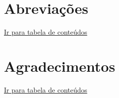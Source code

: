 \documentclass[output=paper,colorlinks,citecolor=brown]{langscibook}
\begin{document}
\chapter*{Abreviações}

\hyperlink{toc}{Ir para tabela de conteúdos\\}



\chapter*{Agradecimentos}

\hyperlink{toc}{Ir para tabela de conteúdos\\}



\printbibliography[heading=subbibliography,notkeyword=this]
\end{document}
